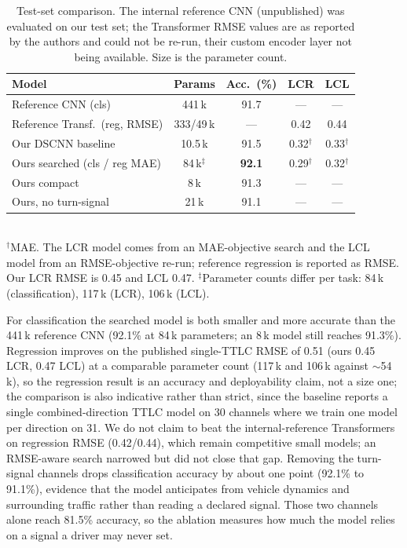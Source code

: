 \documentclass[journal]{IEEEtran}
\begin{document}
\begin{table}[t]
\caption{Test-set comparison. The internal reference CNN (unpublished) was
evaluated on our test set; the Transformer RMSE values are as reported by the
authors and could not be re-run, their custom encoder layer not being available.
Size is the parameter count.}
\label{tab:results}
\centering
\begin{tabular}{lcccc}
\toprule
Model & Params & Acc.\ (\%) & LCR & LCL \\
\midrule
Reference CNN (cls) & 441\,k & 91.7 & --- & --- \\
Reference Transf.\ (reg, RMSE) & 333/49\,k & --- & 0.42 & 0.44 \\
Our DSCNN baseline & 10.5\,k & 91.5 & 0.32$^\dagger$ & 0.33$^\dagger$ \\
\midrule
Ours searched (cls / reg MAE) & 84\,k$^\ddagger$ & \textbf{92.1} & 0.29$^\dagger$ & 0.32$^\dagger$ \\
Ours compact & 8\,k & 91.3 & --- & --- \\
Ours, no turn-signal & 21\,k & 91.1 & --- & --- \\
\bottomrule
\end{tabular}
\\[2pt]
\footnotesize $^\dagger$MAE. The LCR model comes from an MAE-objective search
and the LCL model from an RMSE-objective re-run; reference regression is
reported as RMSE. Our LCR RMSE is 0.45 and LCL 0.47.
$^\ddagger$Parameter counts differ per task: 84\,k (classification),
117\,k (LCR), 106\,k (LCL).
\end{table}

For classification the searched model is both smaller and more accurate than the
441\,k reference CNN (92.1\% at 84\,k parameters; an 8\,k model still reaches
91.3\%). Regression improves on the published single-TTLC RMSE of 0.51
\cite{lcintention2026} (ours 0.45 LCR, 0.47 LCL) at a comparable parameter count
(117\,k and 106\,k against $\sim$54\,k), so the regression result is an accuracy
and deployability claim, not a size one; the comparison is also indicative
rather than strict, since the baseline reports a single combined-direction TTLC
model on 30 channels where we train one model per direction on 31. We do not claim to beat the
internal-reference Transformers on regression RMSE (0.42/0.44), which remain
competitive small models; an RMSE-aware search narrowed but did not close that
gap. Removing the turn-signal channels drops classification
accuracy by about one point (92.1\% to 91.1\%), evidence that the model
anticipates from vehicle dynamics and surrounding traffic rather than reading a
declared signal. Those two channels alone reach 81.5\% accuracy, so the ablation
measures how much the model relies on a signal a driver may never set.
\end{document}
